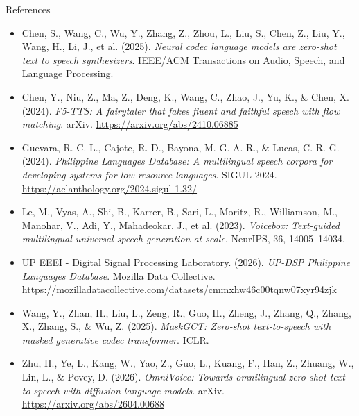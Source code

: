 \documentclass[aspectratio=169]{beamer}
\begin{document}
\begin{frame}{References}
  \tiny
  \begin{itemize}
    \item Chen, S., Wang, C., Wu, Y., Zhang, Z., Zhou, L., Liu, S., Chen, Z., Liu, Y., Wang, H., Li, J., et al. (2025). \textit{Neural codec language models are zero-shot text to speech synthesizers}. IEEE/ACM Transactions on Audio, Speech, and Language Processing.
    \item Chen, Y., Niu, Z., Ma, Z., Deng, K., Wang, C., Zhao, J., Yu, K., \& Chen, X. (2024). \textit{F5-TTS: A fairytaler that fakes fluent and faithful speech with flow matching}. arXiv. \url{https://arxiv.org/abs/2410.06885}
    \item Guevara, R. C. L., Cajote, R. D., Bayona, M. G. A. R., \& Lucas, C. R. G. (2024). \textit{Philippine Languages Database: A multilingual speech corpora for developing systems for low-resource languages}. SIGUL 2024. \url{https://aclanthology.org/2024.sigul-1.32/}
    \item Le, M., Vyas, A., Shi, B., Karrer, B., Sari, L., Moritz, R., Williamson, M., Manohar, V., Adi, Y., Mahadeokar, J., et al. (2023). \textit{Voicebox: Text-guided multilingual universal speech generation at scale}. NeurIPS, 36, 14005--14034.
    \item UP EEEI - Digital Signal Processing Laboratory. (2026). \textit{UP-DSP Philippine Languages Database}. Mozilla Data Collective. \url{https://mozilladatacollective.com/datasets/cmmxhw46c00tqnw07xyr94zjk}
    \item Wang, Y., Zhan, H., Liu, L., Zeng, R., Guo, H., Zheng, J., Zhang, Q., Zhang, X., Zhang, S., \& Wu, Z. (2025). \textit{MaskGCT: Zero-shot text-to-speech with masked generative codec transformer}. ICLR.
    \item Zhu, H., Ye, L., Kang, W., Yao, Z., Guo, L., Kuang, F., Han, Z., Zhuang, W., Lin, L., \& Povey, D. (2026). \textit{OmniVoice: Towards omnilingual zero-shot text-to-speech with diffusion language models}. arXiv. \url{https://arxiv.org/abs/2604.00688}
  \end{itemize}
\end{frame}
\end{document}
